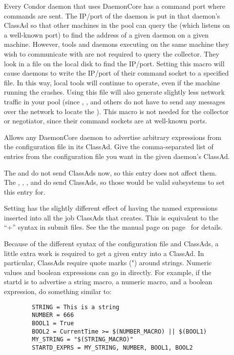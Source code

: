 \begin{description}
\item[]
  \label{param:SubsysAddressFile} Every Condor daemon that uses
  DaemonCore has a command port where commands are sent.  The
  IP/port of the daemon is put in that daemon's ClassAd so that other
  machines in the pool can query the  (which listens
  on a well-known port) to find the address of a given daemon on a
  given machine.  However, tools and daemons executing on the same
  machine they wish to communicate with are not required to query the
  collector. They look in a file on the local disk to find
  the IP/port.  Setting this macro will cause daemons to write the
  IP/port of their command socket to a specified file.  In this way,
  local tools will continue to operate, even if the machine running
  the  crashes.  Using this file will also generate
  slightly less network traffic in your pool (since ,
  , and others do not have to send any messages over the network to
  locate the ).  This macro is not needed
  for the collector or negotiator, since their command sockets are at
  well-known ports.  
  
\item[] \label{param:SubsysExprs}
  Allows any DaemonCore daemon to advertise arbitrary
  expressions from the configuration file in its ClassAd.  Give the
  comma-separated list of entries from the configuration file you want in the
  given daemon's ClassAd.
  
  \Note The  and  do not send
  ClassAds now, so this entry does not affect them.  The
  , , , and
   do send ClassAds, so those would be valid
  subsystems to set this entry for.
  
  Setting  has the slightly
  different effect of having the named expressions inserted into all
  the job ClassAds that  creates.  This is equivalent
  to the ``+'' syntax in submit files.  See the
  the  manual page
  on page~\pageref{man-condor-submit} for details.

  Because of the different syntax of the configuration
  file and ClassAds, a little extra work is required to get a
  given entry into a ClassAd.  In particular, ClassAds require quote
  marks (") around strings.  Numeric values and boolean expressions
  can go in directly.  
  For example, if the startd is to advertise a string macro, a numeric
  macro, and a boolean expression, do something similar to:

\begin{verbatim}
        STRING = This is a string 
        NUMBER = 666
        BOOL1 = True
        BOOL2 = CurrentTime >= $(NUMBER_MACRO) || $(BOOL1)
        MY_STRING = "$(STRING_MACRO)"
        STARTD_EXPRS = MY_STRING, NUMBER, BOOL1, BOOL2
\end{verbatim}

\end{description}

